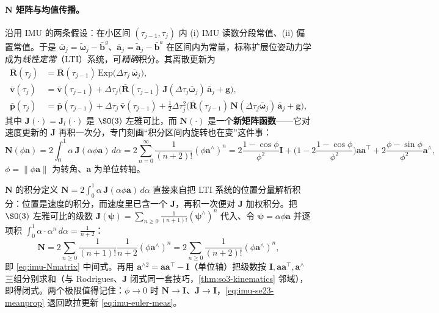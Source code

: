 \paragraph{\texorpdfstring{$\mathbf N$}{N} 矩阵与均值传播。}
沿用 IMU 的两条假设：在小区间 $(\tau_{j-1},\tau_j)$ 内 (i) IMU 读数分段常值、(ii) 偏置常值。于是 $\bar{\boldsymbol\omega}_j=\tilde{\boldsymbol\omega}_j-\bar{\mathbf b}^g$、$\bar{\mathbf a}_j=\tilde{\mathbf a}_j-\bar{\mathbf b}^a$ 在区间内为常量，标称扩展位姿动力学成为\emph{线性定常}（LTI）系统，可\emph{精确}积分。其离散更新为\cite{barfoot2024state}
\begin{equation}
\begin{aligned}
  \bar{\mathbf R}(\tau_j)&=\bar{\mathbf R}(\tau_{j-1})\,\mathrm{Exp}\!\big(\Delta\tau_j\,\bar{\boldsymbol\omega}_j\big),\\
  \bar{\mathbf v}(\tau_j)&=\bar{\mathbf v}(\tau_{j-1})+\Delta\tau_j\Big(\bar{\mathbf R}(\tau_{j-1})\,\mathbf J(\Delta\tau_j\bar{\boldsymbol\omega}_j)\,\bar{\mathbf a}_j+\mathbf g\Big),\\
  \bar{\mathbf p}(\tau_j)&=\bar{\mathbf p}(\tau_{j-1})+\Delta\tau_j\,\bar{\mathbf v}(\tau_{j-1})+\tfrac12\Delta\tau_j^2\Big(\bar{\mathbf R}(\tau_{j-1})\,\mathbf N(\Delta\tau_j\bar{\boldsymbol\omega}_j)\,\bar{\mathbf a}_j+\mathbf g\Big),
\end{aligned}
  \label{eq:imu-se23-meanprop}
\end{equation}
其中 $\mathbf J(\cdot)=\mathbf J_l(\cdot)$ 是 $\SO(3)$ 左雅可比，而 $\mathbf N(\cdot)$ 是一个\textbf{新矩阵函数}——它对速度更新的 $\mathbf J$ 再积一次分，专门刻画“积分区间内旋转也在变”这件事：
\begin{equation}
  \mathbf N(\phi\mathbf a)=2\!\int_0^1\!\alpha\,\mathbf J(\alpha\phi\mathbf a)\,d\alpha
  =2\sum_{n=0}^\infty\frac{1}{(n+2)!}(\phi\mathbf a^\wedge)^n
  =2\frac{1-\cos\phi}{\phi^2}\mathbf I+\Big(1-2\frac{1-\cos\phi}{\phi^2}\Big)\mathbf a\mathbf a^\top+2\frac{\phi-\sin\phi}{\phi^2}\mathbf a^\wedge,
  \label{eq:imu-Nmatrix}
\end{equation}
$\phi=\|\phi\mathbf a\|$ 为转角、$\mathbf a$ 为单位转轴。

\begin{derivation}
$\mathbf N$ 的积分定义 $\mathbf N=2\int_0^1\alpha\,\mathbf J(\alpha\phi\mathbf a)\,d\alpha$ 直接来自把 LTI 系统的位置分量解析积分：位置是速度的积分，而速度里已含一个 $\mathbf J$，再积一次便对 $\mathbf J$ 加权积分。把 $\SO(3)$ 左雅可比的级数 $\mathbf J(\boldsymbol\psi)=\sum_{n\ge0}\frac{1}{(n+1)!}(\boldsymbol\psi^\wedge)^n$ 代入、令 $\boldsymbol\psi=\alpha\phi\mathbf a$ 并逐项积 $\int_0^1\alpha\cdot\alpha^n\,d\alpha=\frac{1}{n+2}$：
\[
  \mathbf N=2\sum_{n\ge0}\frac{1}{(n+1)!}\frac{1}{n+2}(\phi\mathbf a^\wedge)^n=2\sum_{n\ge0}\frac{1}{(n+2)!}(\phi\mathbf a^\wedge)^n,
\]
即 \cref{eq:imu-Nmatrix} 中间式。再用 $\mathbf a^{\wedge2}=\mathbf a\mathbf a^\top-\mathbf I$（单位轴）把级数按 $\mathbf I,\mathbf a\mathbf a^\top,\mathbf a^\wedge$ 三组分别求和（与 Rodrigues、$\mathbf J$ 闭式同一套技巧，\cref{thm:so3-kinematics} 邻域），即得闭式。两个极限值得记住：$\phi\to0$ 时 $\mathbf N\to\mathbf I$、$\mathbf J\to\mathbf I$，\cref{eq:imu-se23-meanprop} 退回欧拉更新 \cref{eq:imu-euler-meas}。
\end{derivation}

